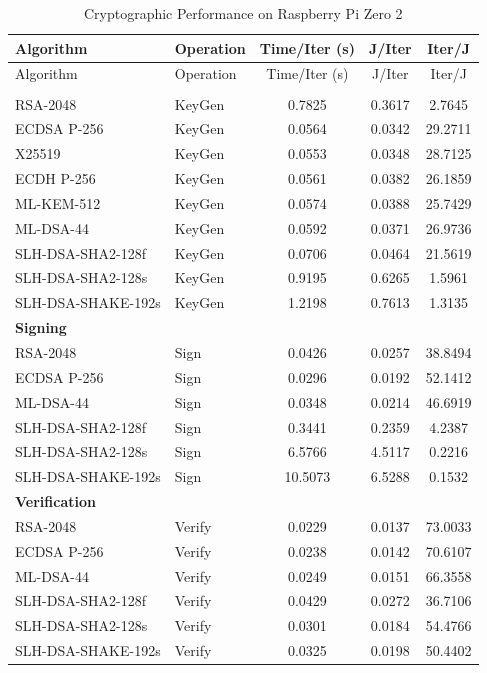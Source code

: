 \documentclass[11pt, letterpaper]{article}
\begin{document}
\begin{longtable}{llccc}
\caption{Cryptographic Performance on Raspberry Pi Zero 2} \\
\hline
Algorithm & Operation & Time/Iter (s) & J/Iter & Iter/J \\
\hline
\endfirsthead

\hline
Algorithm & Operation & Time/Iter (s) & J/Iter & Iter/J \\
\hline
\endhead

\hline
\endfoot

\hline
\endlastfoot

\multicolumn{5}{l}{\textbf{Key Generation}} \\

RSA-2048 & KeyGen & 0.7825 & 0.3617 & 2.7645 \\
ECDSA P-256 & KeyGen & 0.0564 & 0.0342 & 29.2711 \\
X25519 & KeyGen & 0.0553 & 0.0348 & 28.7125 \\
ECDH P-256 & KeyGen & 0.0561 & 0.0382 & 26.1859 \\
ML-KEM-512 & KeyGen & 0.0574 & 0.0388 & 25.7429 \\
ML-DSA-44 & KeyGen & 0.0592 & 0.0371 & 26.9736 \\
SLH-DSA-SHA2-128f & KeyGen & 0.0706 & 0.0464 & 21.5619 \\
SLH-DSA-SHA2-128s & KeyGen & 0.9195 & 0.6265 & 1.5961 \\
SLH-DSA-SHAKE-192s & KeyGen & 1.2198 & 0.7613 & 1.3135 \\

\multicolumn{5}{l}{\textbf{Signing}} \\

RSA-2048 & Sign & 0.0426 & 0.0257 & 38.8494 \\
ECDSA P-256 & Sign & 0.0296 & 0.0192 & 52.1412 \\
ML-DSA-44 & Sign & 0.0348 & 0.0214 & 46.6919 \\
SLH-DSA-SHA2-128f & Sign & 0.3441 & 0.2359 & 4.2387 \\
SLH-DSA-SHA2-128s & Sign & 6.5766 & 4.5117 & 0.2216 \\
SLH-DSA-SHAKE-192s & Sign & 10.5073 & 6.5288 & 0.1532 \\

\multicolumn{5}{l}{\textbf{Verification}} \\

RSA-2048 & Verify & 0.0229 & 0.0137 & 73.0033 \\
ECDSA P-256 & Verify & 0.0238 & 0.0142 & 70.6107 \\
ML-DSA-44 & Verify & 0.0249 & 0.0151 & 66.3558 \\
SLH-DSA-SHA2-128f & Verify & 0.0429 & 0.0272 & 36.7106 \\
SLH-DSA-SHA2-128s & Verify & 0.0301 & 0.0184 & 54.4766 \\
SLH-DSA-SHAKE-192s & Verify & 0.0325 & 0.0198 & 50.4402 \\

\end{longtable}
\end{document}
